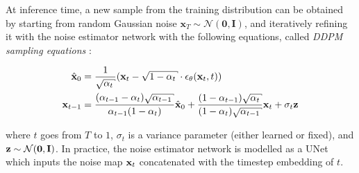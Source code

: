 








At inference time, a new sample from the training distribution can be obtained by starting from 
random Gaussian noise $\mathbf{x}_T \sim \mathcal{N}(\mathbf{0}, \mathbf{I})$, and iteratively
refining it with the noise estimator network with the following equations, called 
\textit{DDPM sampling equations} \citep{ho2020denoising}:

\begin{align*}
      \hat{\x}_0 &= \frac{1}{\sqrt{\alpha_t}}(\x_t - \sqrt{1 - \alpha_t} \cdot \epsilon_\theta(\x_t, t)) \\
      \x_{t-1} &= \frac{(\alpha_{t-1}-\alpha_t) \sqrt{\alpha_{t-1}}}{\alpha_{t-1}(1 - \alpha_t)} \hat{\x}_0 + \frac{(1-\alpha_{t-1})\sqrt{\alpha_t}}{(1 - \alpha_t)\sqrt{\alpha_{t-1}}} \x_t + \sigma_t \z
\end{align*}

where $t$ goes from $T$ to $1$, 
$\sigma_t$ is a variance parameter (either learned or fixed), and $\mathbf{z} \sim \mathcal{N}(\mathbf{0}, \mathbf{I})$.
In practice, the noise estimator network is modelled as a UNet \citep{ronneberger2015UNet} 
which inputs the noise map $\mathbf{x}_t$ concatenated with the timestep embedding of $t$. 



